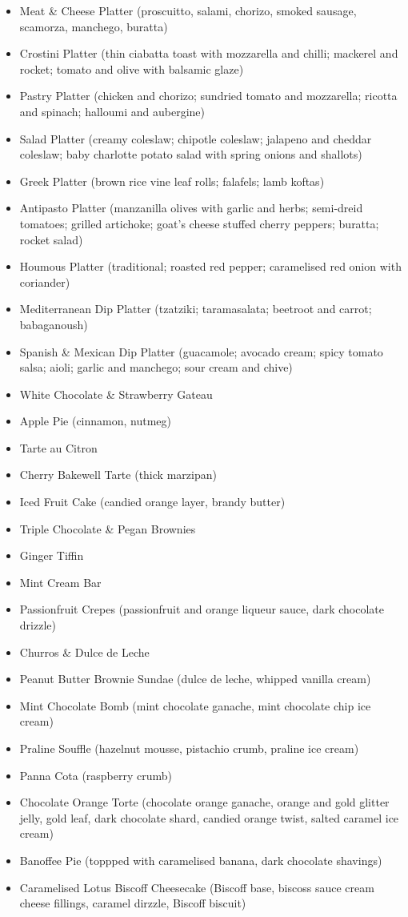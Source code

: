 \documentclass[11pt, english]{article}
\begin{document}
\begin{itemize}
		\item Meat \& Cheese Platter (proscuitto, salami, chorizo, smoked sausage, scamorza, manchego, buratta)
		\item Crostini Platter (thin ciabatta toast with mozzarella and chilli; mackerel and rocket; tomato and olive with balsamic glaze)
		\item Pastry Platter (chicken and chorizo; sundried tomato and mozzarella; ricotta and spinach; halloumi and aubergine)
		\item Salad Platter (creamy coleslaw; chipotle coleslaw; jalapeno and cheddar coleslaw; baby charlotte potato salad with spring onions and shallots)
		\item Greek Platter (brown rice vine leaf rolls; falafels; lamb koftas)
		\item Antipasto Platter (manzanilla olives with garlic and herbs; semi-dreid tomatoes; grilled artichoke; goat's cheese stuffed cherry peppers; buratta; rocket salad)
		\item Houmous Platter (traditional; roasted red pepper; caramelised red onion with coriander)
		\item Mediterranean Dip Platter (tzatziki; taramasalata; beetroot and carrot; babaganoush)
		\item Spanish \& Mexican Dip Platter (guacamole; avocado cream; spicy tomato salsa; aioli; garlic and manchego; sour cream and chive)
		\item White Chocolate \& Strawberry Gateau
		\item Apple Pie (cinnamon, nutmeg)
		\item Tarte au Citron
		\item Cherry Bakewell Tarte (thick marzipan)
		\item Iced Fruit Cake (candied orange layer, brandy butter)
		\item Triple Chocolate \& Pegan Brownies
		\item Ginger Tiffin
		\item Mint Cream Bar
		\item Passionfruit Crepes (passionfruit and orange liqueur sauce, dark chocolate drizzle)
		\item Churros \& Dulce de Leche
		\item Peanut Butter Brownie Sundae (dulce de leche, whipped vanilla cream)
		\item Mint Chocolate Bomb (mint chocolate ganache, mint chocolate chip ice cream)
		\item Praline Souffle (hazelnut mousse, pistachio crumb, praline ice cream)
		\item Panna Cota (raspberry crumb)
		\item Chocolate Orange Torte (chocolate orange ganache, orange and gold glitter jelly, gold leaf, dark chocolate shard, candied orange twist, salted caramel ice cream)
		\item Banoffee Pie (toppped with caramelised banana, dark chocolate shavings)
		\item Caramelised Lotus Biscoff Cheesecake (Biscoff base, biscoss sauce cream cheese fillings, caramel dirzzle, Biscoff biscuit)
        \end{itemize}
\end{document}
